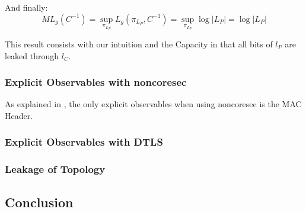 And finally:
\begin{equation}
	ML_g(C^{-1}) = \sup_{\pi_{L_P}}{L_g(\pi_{L_P},C^{-1})} =  \sup_{\pi_{L_P}}\log{|L_P|} = \log{|L_P|}
\end{equation}

This result consists with our intuition and the Capacity in  that all bits of $l_P$ are leaked through $l_C$.

\subsubsection{Explicit Observables with noncoresec}

As explained in , the only explicit observables when using noncoresec is the MAC Header. 



\subsubsection{Explicit Observables with DTLS}


\subsubsection{Leakage of Topology}

\subsection{Conclusion}